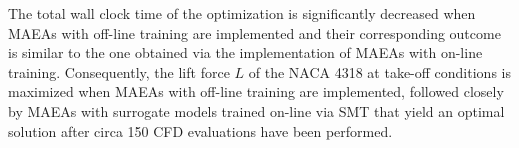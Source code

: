 
The total wall clock time of the optimization is significantly 
decreased when MAEAs with off-line training are implemented and 
their corresponding outcome is similar to the one obtained via the 
implementation of MAEAs with on-line training. Consequently, the 
lift force $L$ of the NACA 4318 at take-off conditions is maximized 
when MAEAs with off-line training are implemented, followed closely 
by MAEAs with surrogate models trained on-line via SMT that yield 
an optimal solution after circa 150 CFD evaluations have been 
performed. 


